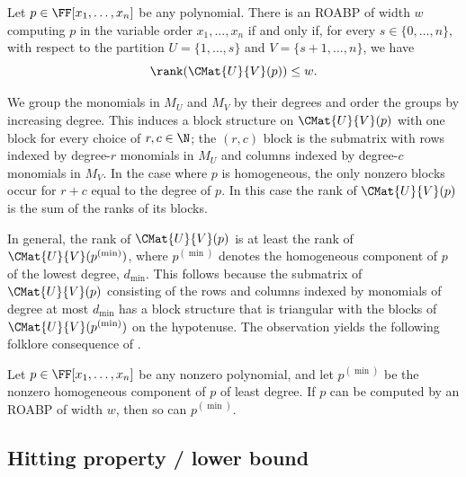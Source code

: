 \begin{lemma}
  \label{lem.roabp-char}
  Let \(p\in\FF[x_1,\ldots,x_n]\) be any polynomial.
  There is an ROABP of width \(w\) computing \(p\) in the variable order
  \(x_1,\ldots,x_n\) if and only if,
  for every \(s \in \{0,\ldots,n\}\),
  with respect to the partition
  \(U = \{1,\ldots,s\}\) and \(V = \{{s+1},\ldots,n\}\),
  we have
  \[
    \rank( \CMat{U}{V}(p) ) \le w.
  \]
\end{lemma}

We group the monomials in $M_U$ and $M_V$ by their degrees
and order the groups by increasing degree.
This induces a block structure on $\CMat{U}{V}(p)$ with one block for every
choice of $r, c \in \N$;
the \((r,c)\) block is the submatrix with rows indexed by degree-\(r\)
monomials in \(M_U\) and columns indexed by degree-\(c\) monomials in \(M_V\).
In the case where $p$ is homogeneous,
the only nonzero blocks occur for $r+c$ equal to the degree of $p$.
In this case the rank of \(\CMat{U}{V}(p)\) is the sum of the ranks of its
blocks.

In general,
the rank of $\CMat{U}{V}(p)$ is at least the rank of
$\CMat{U}{V}(p^{(\min)})$,
where $p^{(\min)}$ denotes the homogeneous component of $p$ of the lowest degree,
$d_{\min}$.
This follows because the submatrix of $\CMat{U}{V}(p)$ consisting of the rows
and columns indexed by monomials of degree at most $d_{\min}$ has a block
structure that is triangular with the blocks of $\CMat{U}{V}(p^{(\min)})$ on
the hypotenuse.
The observation yields the following folklore consequence of
.
\begin{proposition}
  \label{prop.roabp-homog}
  \def\pdn{p^{(\min)}}
  Let \(p\in\FF[x_1,\ldots,x_n]\) be any nonzero polynomial,
  and let \(\pdn\) be the nonzero homogeneous component of \(p\) of least degree.
  If \(p\) can be computed by an ROABP of width \(w\),
  then so can \(\pdn\).
\end{proposition}

\subsection{Hitting property / lower bound}
\label{s.roabp.hitting-lower}

